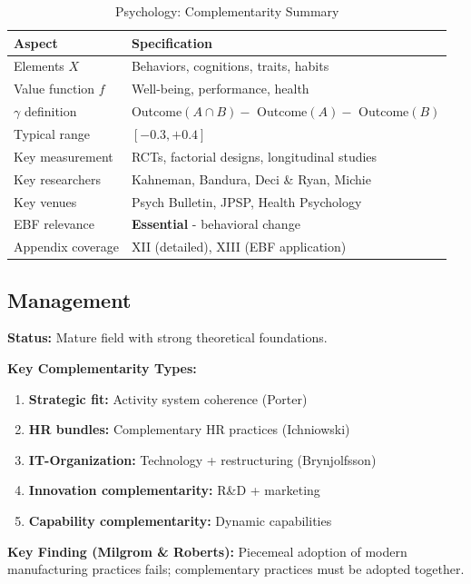 \begin{table}[h]
\centering
\caption{Psychology: Complementarity Summary}
\label{tab:psych-summary}
\renewcommand{\arraystretch}{1.3}
\small
\begin{tabular}{@{}ll@{}}
\toprule
\textbf{Aspect} & \textbf{Specification} \\
\midrule
Elements $X$ & Behaviors, cognitions, traits, habits \\
Value function $f$ & Well-being, performance, health \\
$\gamma$ definition & Outcome$(A \cap B) - $ Outcome$(A) - $ Outcome$(B)$ \\
Typical range & $[-0.3, +0.4]$ \\
Key measurement & RCTs, factorial designs, longitudinal studies \\
Key researchers & Kahneman, Bandura, Deci \& Ryan, Michie \\
Key venues & Psych Bulletin, JPSP, Health Psychology \\
EBF relevance & \textbf{Essential} - behavioral change \\
Appendix coverage & XII (detailed), XIII (EBF application) \\
\bottomrule
\end{tabular}
\end{table}

\subsection{Management}
\label{sec:mgmt}

\begin{tcolorbox}[colback=orange!5!white,colframe=orange!75!black,title=\textbf{Management: Organizational Complementarities}]

\textbf{Status:} Mature field with strong theoretical foundations.

\textbf{Key Complementarity Types:}
\begin{enumerate}[noitemsep]
    \item \textbf{Strategic fit:} Activity system coherence (Porter)
    \item \textbf{HR bundles:} Complementary HR practices (Ichniowski)
    \item \textbf{IT-Organization:} Technology + restructuring (Brynjolfsson)
    \item \textbf{Innovation complementarity:} R\&D + marketing
    \item \textbf{Capability complementarity:} Dynamic capabilities
\end{enumerate}

\textbf{Key Finding (Milgrom \& Roberts):}
Piecemeal adoption of modern manufacturing practices fails; complementary practices must be adopted together.

\end{tcolorbox}

